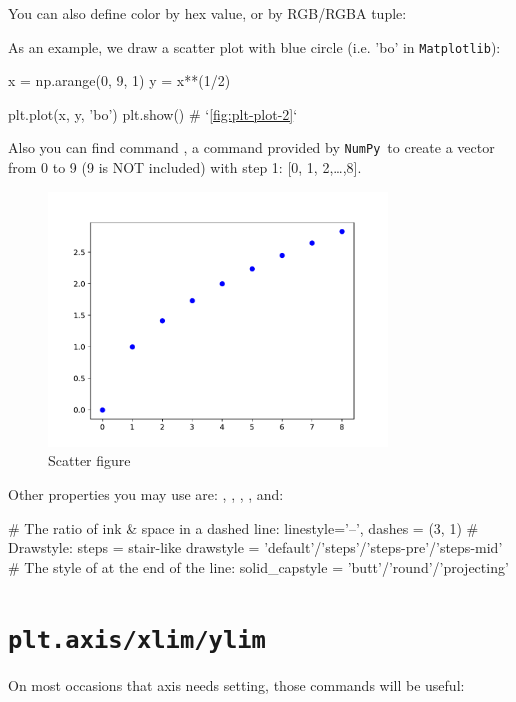 \documentclass{report}
\newcommand{\pkg}[1]{\texttt{#1}}
\newcommand{\NumPy}{\pkg{NumPy}}
\newcommand{\mpl}{\texttt{Matplotlib}}
\begin{document}
You can also define color by hex value, or by RGB/RGBA tuple:

As an example, we draw a scatter plot with blue circle (i.e. 'bo' in \mpl):
\begin{py}
x = np.arange(0, 9, 1)
y = x**(1/2)

plt.plot(x, y, 'bo')
plt.show() # `\autoref{fig:plt-plot-2}`
\end{py}

Also you can find command , a command provided by \NumPy\ to create a vector from 0 to 9 (9 is NOT included) with step 1: [0, 1, 2,\ldots ,8]. 

\begin{figure}[!htb]
  \centering
  \includegraphics[width=90mm]{plt-plot-2}
  \caption{Scatter figure}
  \label{fig:plt-plot-2}
\end{figure}

Other properties you may use are: , , , , and:
\begin{py}
# The ratio of ink & space in a dashed line:
linestyle='--', dashes = (3, 1)
# Drawstyle: steps = stair-like
drawstyle = 'default'/'steps'/'steps-pre'/'steps-mid'
# The style of at the end of the line: 
solid_capstyle = 'butt'/'round'/'projecting'
\end{py} 

\section{\texttt{plt.axis/xlim/ylim}}
On most occasions that axis needs setting, those commands will be useful:
\end{document}
